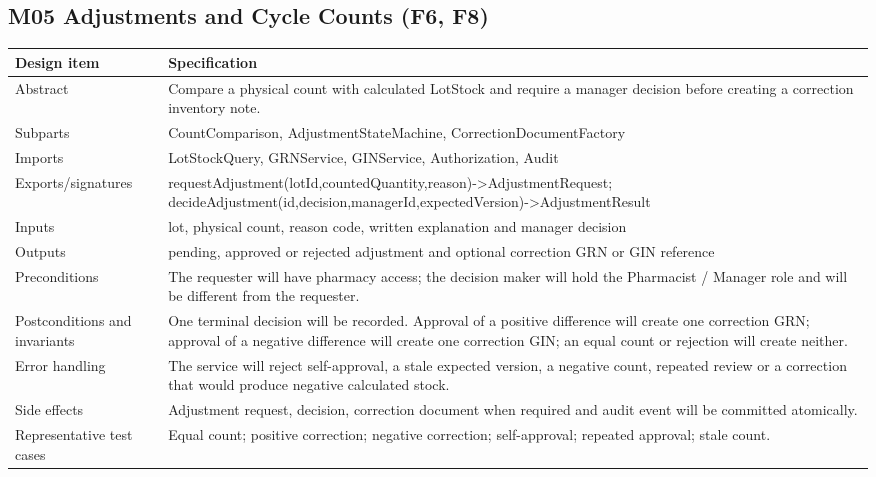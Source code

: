 \subsection{M05 Adjustments and Cycle Counts (F6, F8)}\label{m05-adjustments-and-cycle-counts-f6-f8}

{\def\LTcaptype{none} %
\begin{longtable}[]{|
  >{\raggedright\arraybackslash}m{}|
  >{\raggedright\arraybackslash}m{}|}
\hline
\begin{minipage}[c]{\linewidth}\raggedright
\textbf{Design item}
\end{minipage} & \begin{minipage}[c]{\linewidth}\raggedright
\textbf{Specification}
\end{minipage} \\
\hline
\endhead

\endlastfoot
Abstract & Compare a physical count with calculated LotStock and require a manager decision before creating a correction inventory note. \\ \hline
Subparts & CountComparison, AdjustmentStateMachine, CorrectionDocumentFactory \\ \hline
Imports & LotStockQuery, GRNService, GINService, Authorization, Audit \\ \hline
Exports/signatures & requestAdjustment(lotId,countedQuantity,reason)-\textgreater AdjustmentRequest; decideAdjustment(id,decision,managerId,expectedVersion)-\textgreater AdjustmentResult \\ \hline
Inputs & lot, physical count, reason code, written explanation and manager decision \\ \hline
Outputs & pending, approved or rejected adjustment and optional correction GRN or GIN reference \\ \hline
Preconditions & The requester will have pharmacy access; the decision maker will hold the Pharmacist / Manager role and will be different from the requester. \\ \hline
Postconditions and invariants & One terminal decision will be recorded. Approval of a positive difference will create one correction GRN; approval of a negative difference will create one correction GIN; an equal count or rejection will create neither. \\ \hline
Error handling & The service will reject self-approval, a stale expected version, a negative count, repeated review or a correction that would produce negative calculated stock. \\ \hline
Side effects & Adjustment request, decision, correction document when required and audit event will be committed atomically. \\ \hline
Representative test cases & Equal count; positive correction; negative correction; self-approval; repeated approval; stale count. \\ \hline
\end{longtable}
}

